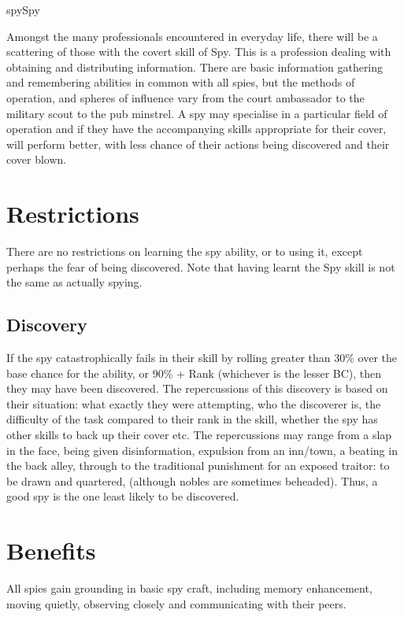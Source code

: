 \begin{Skill}[2.0]{spy}{Spy}

Amongst the many professionals encountered in everyday life, there
will be a scattering of those with the covert skill of Spy.  This is a
profession dealing with obtaining and distributing information.
There are basic information gathering and remembering abilities in
common with all spies, but the methods of operation, and spheres of
influence vary from the court ambassador to the military scout to
the pub minstrel. A spy may specialise in a particular field of
operation and if they have the accompanying skills appropriate for
their cover, will perform better, with less chance of their actions
being discovered and their cover blown.

\section{Restrictions}

There are no restrictions on learning the spy ability, or to using it,
except perhaps the fear of being discovered.  Note that having learnt
the Spy skill is not the same as actually spying.

\subsection{Discovery}

If the spy catastrophically fails in their skill by rolling greater
than 30\% over the base chance for the ability, or 90\% + Rank
(whichever is the lesser BC), then they may have been discovered.  The
repercussions of this discovery is based on their situation: what
exactly they were attempting, who the discoverer is, the difficulty of
the task compared to their rank in the skill, whether the spy has
other skills to back up their cover etc.  The repercussions may range
from a slap in the face, being given disinformation, expulsion from an
inn/town, a beating in the back alley, through to the traditional
punishment for an exposed traitor: to be drawn and quartered,
(although nobles are sometimes beheaded). Thus, a good spy is the one
least likely to be discovered.

\section{Benefits}

All spies gain grounding in basic spy craft, including memory
enhancement, moving quietly, observing closely and communicating with
their peers.


\end{Skill}
